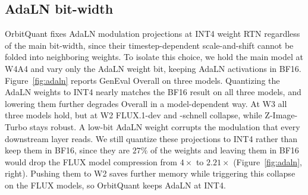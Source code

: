 

\subsection{AdaLN bit-width}
\label{sec:ablation:adaln}
OrbitQuant fixes AdaLN modulation projections at INT4 weight RTN regardless of the main bit-width, since their timestep-dependent scale-and-shift cannot be folded into neighboring weights. To isolate this choice, we hold the main model at W4A4 and vary only the AdaLN weight bit, keeping AdaLN activations in BF16. Figure~\ref{fig:adaln} reports GenEval Overall on three models.
Quantizing the AdaLN weights to INT4 nearly matches the BF16 result on all three models, and lowering them further degrades Overall in a model-dependent way. At W3 all three models hold, but at W2 FLUX.1-dev and -schnell collapse, while Z-Image-Turbo stays robust. A low-bit AdaLN weight corrupts the modulation that every downstream layer reads. We still quantize these projections to INT4 rather than keep them in BF16, since they are $27\%$ of the weights and leaving them in BF16 would drop the FLUX model compression from $4\times$ to $2.21\times$ (Figure~\ref{fig:adaln}, right). Pushing them to W2 saves further memory while triggering this collapse on the FLUX models, so OrbitQuant keeps AdaLN at INT4.


